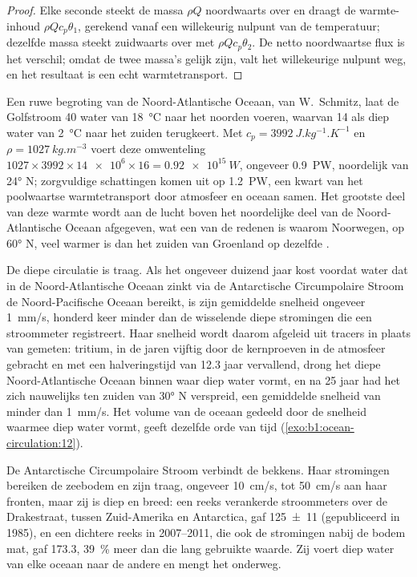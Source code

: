 \begin{proof}
Elke seconde steekt de massa $\rho Q$ noordwaarts over en draagt de warmte-inhoud $\rho Q
c_p\theta_1$, gerekend vanaf een willekeurig nulpunt van de temperatuur; dezelfde massa steekt zuidwaarts over met $\rho Q c_p\theta_2$. De netto noordwaartse flux is het verschil;
omdat de twee massa's gelijk zijn, valt het willekeurige nulpunt weg, en het resultaat is een echt warmtetransport.
\end{proof}

Een ruwe begroting van de Noord-Atlantische Oceaan, van W.~Schmitz, laat de Golfstroom \qty{40}{\sverdrup} water van \qty{18}{\celsius} naar het noorden voeren, waarvan
\qty{14}{\sverdrup} als diep water van \qty{2}{\celsius} naar het zuiden terugkeert. Met $c_p =
\qty{3992}{J.kg^{-1}.K^{-1}}$ en $\rho = \qty{1027}{kg.m^{-3}}$ voert deze omwenteling $1027 \times 3992 \times \num{14e6} \times 16 = \qty{0.92e15}{W}$, ongeveer
\qty{0.9}{PW}, noordelijk van \ang{24} N; zorgvuldige schattingen komen uit op \qty{1.2}{PW}, een kwart van het poolwaartse warmtetransport door atmosfeer en oceaan samen. Het grootste deel van deze warmte wordt aan de lucht boven het noordelijke deel van de Noord-Atlantische Oceaan afgegeven, wat een van de redenen is waarom Noorwegen, op \ang{60} N, veel warmer is dan het zuiden van Groenland op dezelfde .

De diepe circulatie is traag. Als het ongeveer duizend jaar kost voordat water dat in de Noord-Atlantische Oceaan zinkt via de Antarctische Circumpolaire Stroom de Noord-Pacifische Oceaan bereikt, is zijn gemiddelde snelheid ongeveer \qty{1}{mm/s}, honderd keer minder dan de wisselende diepe stromingen die een stroommeter registreert. Haar snelheid wordt daarom afgeleid uit tracers in plaats van gemeten: tritium, in de jaren vijftig door de kernproeven in de atmosfeer gebracht en met een halveringstijd van 12.3 jaar vervallend, drong het diepe Noord-Atlantische Oceaan binnen waar diep water vormt, en na 25 jaar had het zich nauwelijks ten zuiden van \ang{30} N verspreid, een gemiddelde snelheid van minder dan \qty{1}{mm/s}. Het volume van de oceaan gedeeld door de snelheid waarmee diep water vormt, geeft dezelfde orde van tijd (\cref{exo:b1:ocean-circulation:12}).

De Antarctische Circumpolaire Stroom verbindt de bekkens. Haar stromingen bereiken de zeebodem en zijn traag, ongeveer \qty{10}{cm/s}, tot \qty{50}{cm/s} aan haar fronten, maar zij is diep en breed: een reeks verankerde stroommeters over de Drakestraat, tussen Zuid-Amerika en Antarctica, gaf \qty[uncertainty-mode=separate]{125 \pm 11}{\sverdrup} (gepubliceerd in 1985), en een dichtere reeks in 2007--2011, die ook de stromingen nabij de bodem mat, gaf \qty{173.3}{\sverdrup}, \qty{39}{\percent} meer dan die lang gebruikte waarde. Zij voert diep water van elke oceaan naar de andere en mengt het onderweg.

